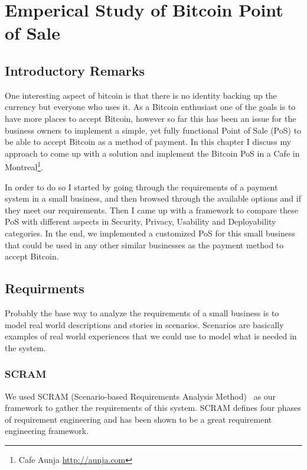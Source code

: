 
\chapter{Emperical Study of Bitcoin Point of Sale}


\section{Introductory Remarks}

One interesting aspect of bitcoin is that there is no identity backing up the currency but everyone who uses it. As a Bitcoin enthusiast one of the goals is to have more places to accept Bitcoin, however so far this has been an issue for the business owners to implement a simple, yet fully functional Point of Sale (PoS) to be able to accept Bitcoin as a method of payment.
In this chapter I discuss my approach to come up with a solution and implement the Bitcoin PoS in a Cafe in Montreal\footnote{ Cafe Aunja \url{http://aunja.com}}.

In order to do so I started by going through the requirements of a payment system in a small business, and then browsed through the available options and if they meet our requirements. Then I came up with a framework to compare these PoS with different aspects in Security, Privacy, Usability and Deployability categories. In the end, we implemented a customized PoS for this small business that could be used in any other similar businesses as the payment method to accept Bitcoin.

\section {Requirments}
Probably the base way to analyze the requirements of a small business is to model real world descriptions and stories in scenarios. Scenarios are basically examples of real world experiences that we could use to model what is needed in the system. 

\subsection{SCRAM}
We used SCRAM (Scenario-based Requirements Analysis Method)~\cite{REScenario} as our framework to gather the requirements of this system.
SCRAM defines four phases of requirement engineering and has been shown to be a great requirement engineering framework.


